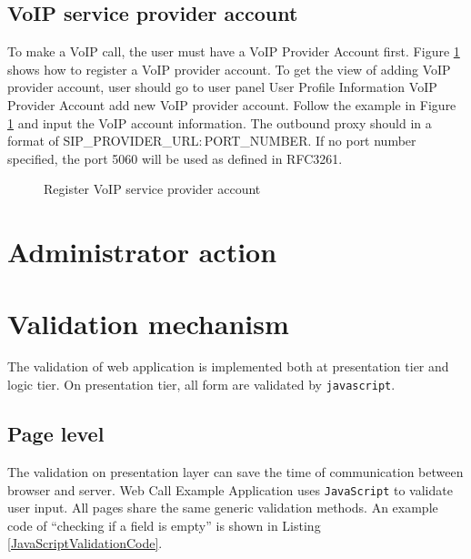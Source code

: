 \subsection{VoIP service provider account}

To make a VoIP call, the user must have a VoIP Provider Account first. Figure \ref{fig:RegisterVoIPAccount} shows how to register a VoIP provider account. To get the view of adding VoIP provider account, user should go to user panel \textrightarrow{} User Profile Information \textrightarrow{} VoIP Provider Account \textrightarrow{} add new VoIP provider account.
Follow the example in Figure \ref{fig:RegisterVoIPAccount} and input the VoIP account information. The outbound proxy should in a format of SIP\_PROVIDER\_URL$\colon$PORT\_NUMBER. If no port number specified, the port 5060 will be used as defined in RFC3261\cite{RFC3261}.

\begin{figure}[!hbtp]
\centering
{}
\caption{Register VoIP service provider account}
\label{fig:RegisterVoIPAccount}
\end{figure} 

\section{Administrator action}
\label{sec:WebApplication:AdministratorAction}


\section{Validation mechanism}
\label{sec:WebApplication:ValidationMechanism}

The validation of web application is implemented both at presentation tier and logic tier. On presentation tier, all form are validated by \texttt{javascript}. 

\subsection{Page level}
\label{sec:WebApplication:ValidationMechanism:PageLevel}

The validation on presentation layer can save the time of communication between browser and server. Web Call Example Application uses \texttt{JavaScript} to validate user input. All pages share the same generic validation methods. An example code of ``checking if a field is empty'' is shown in Listing \ref{JavaScriptValidationCode}.

